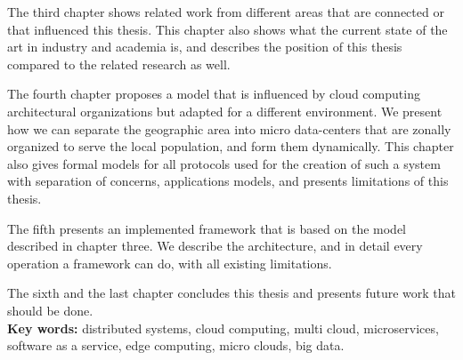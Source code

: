 The third chapter shows related work from different areas that are connected or that influenced this thesis. This chapter also shows what the current state of the art in industry and academia is, and describes the position of this thesis compared to the related research as well.

The fourth chapter proposes a model that is influenced by cloud computing architectural organizations but adapted for a different environment. We present how we can separate the geographic area into micro data-centers that are zonally organized to serve the local population, and form them dynamically. This chapter also gives formal models for all protocols used for the creation of such a system with separation of concerns, applications models, and presents limitations of this thesis.

The fifth presents an implemented framework that is based on the model described in chapter three. We describe the architecture, and in detail every operation a framework can do, with all existing limitations.

The sixth and the last chapter concludes this thesis and presents future work that should be done.\\ 

\noindent
\textbf{Key words:} distributed systems, cloud computing, multi cloud, microservices, software as a service, edge computing, micro clouds, big data.